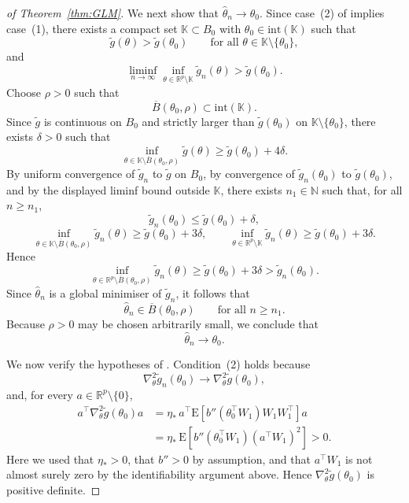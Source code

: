 \documentclass[11pt]{article}
\theoremstyle{plain}
\theoremstyle{definition}
\theoremstyle{remark}
\begin{document}
\begin{proof}[of Theorem~\ref{thm:GLM}]
We next show that $\hat{\theta}_{n}\to\theta_{0}$. Since case~(2)
of \citet[Thm.~5]{miller2021generalized_posteriors} implies case~(1),
there exists a compact set $\mathbb{K}\subset B_0$ with
$\theta_{0}\in\mathrm{int}(\mathbb{K})$ such that
\[
\tilde{g}(\theta)>\tilde{g}(\theta_{0})\qquad\text{for all }\theta\in\mathbb{K}\setminus\{\theta_{0}\},
\]
and
\[
\liminf_{n\to\infty}\inf_{\theta\in\mathbb{R}^{p}\setminus\mathbb{K}}\tilde{g}_{n}(\theta)>\tilde{g}(\theta_{0}).
\]
Choose $\rho>0$ such that
\[
\overline{B}(\theta_{0},\rho)\subset\mathrm{int}(\mathbb{K}).
\]
Since $\tilde{g}$ is continuous on $B_0$ and strictly
larger than $\tilde{g}(\theta_{0})$ on $\mathbb{K}\setminus\{\theta_{0}\}$,
there exists $\delta>0$ such that
\[
\inf_{\theta\in\mathbb{K}\setminus\overline{B}(\theta_{0},\rho)}\tilde{g}(\theta)\ge\tilde{g}(\theta_{0})+4\delta.
\]
By uniform convergence of $\tilde{g}_{n}$ to $\tilde{g}$ on $B_0$,
by convergence of $\tilde{g}_{n}(\theta_{0})$ to $\tilde{g}(\theta_{0})$,
and by the displayed liminf bound outside $\mathbb{K}$, there exists
$n_{1}\in\mathbb{N}$ such that, for all $n\ge n_{1}$,
\[
\tilde{g}_{n}(\theta_{0})\le\tilde{g}(\theta_{0})+\delta,
\]
\[
\inf_{\theta\in\mathbb{K}\setminus\overline{B}(\theta_{0},\rho)}\tilde{g}_{n}(\theta)\ge\tilde{g}(\theta_{0})+3\delta,\qquad\inf_{\theta\in\mathbb{R}^{p}\setminus\mathbb{K}}\tilde{g}_{n}(\theta)\ge\tilde{g}(\theta_{0})+3\delta.
\]
Hence
\[
\inf_{\theta\in\mathbb{R}^{p}\setminus\overline{B}(\theta_{0},\rho)}\tilde{g}_{n}(\theta)\ge\tilde{g}(\theta_{0})+3\delta>\tilde{g}_{n}(\theta_{0}).
\]
Since $\hat{\theta}_{n}$ is a global minimiser of $\tilde{g}_{n}$,
it follows that
\[
\hat{\theta}_{n}\in\overline{B}(\theta_{0},\rho)\qquad\text{for all }n\ge n_{1}.
\]
Because $\rho>0$ may be chosen arbitrarily small, we conclude that
\[
\hat{\theta}_{n}\to\theta_{0}.
\]

We now verify the hypotheses of \citet[Thm.~6]{miller2021generalized_posteriors}.
Condition~(2) holds because
\[
\nabla_{\theta}^{2}\tilde{g}_{n}(\theta_{0})\to\nabla_{\theta}^{2}\tilde{g}(\theta_{0}),
\]
and, for every $a\in\mathbb{R}^{p}\setminus\{0\}$,
\[
\begin{aligned}a^{\top}\nabla_{\theta}^{2}\tilde{g}(\theta_{0})a & =\eta_{*}\,a^{\top}\mathrm{E}\!\left[b''(\theta_{0}^{\top}W_{1})W_{1}W_{1}^{\top}\right]a\\
 & =\eta_{*}\,\mathrm{E}\!\left[b''(\theta_{0}^{\top}W_{1})(a^{\top}W_{1})^{2}\right]>0.
\end{aligned}
\]
Here we used that $\eta_{*}>0$, that $b''>0$ by assumption, and that $a^{\top}W_{1}$ is not almost surely zero by the
identifiability argument above. Hence $\nabla_{\theta}^{2}\tilde{g}(\theta_{0})$
is positive definite.


\end{proof}
\end{document}

